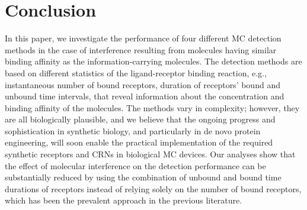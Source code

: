 \documentclass[twocolumn]{IEEEtran}
\newcommand{\E}{\mathrm{E}}
\begin{document}
%

\section{Conclusion}
\label{sec:conclusion}
In this paper, we investigate the performance of four different MC detection methods in the case of interference resulting from molecules having similar binding affinity as the information-carrying molecules. The detection methods are based on different statistics of the ligand-receptor binding reaction, e.g., instantaneous number of bound receptors, duration of receptors' bound and unbound time intervals, that reveal information about the concentration and binding affinity of the molecules. The methods vary in complexity; however, they are all biologically plausible, and we believe that the ongoing progress and sophistication in synthetic biology, and particularly in de novo protein engineering,  will soon enable the practical implementation of the required synthetic receptors and CRNs in biological MC devices. Our analyses show that the effect of molecular interference on the detection performance can be substantially reduced by using the combination of unbound and bound time durations of receptors instead of relying solely on the number of bound receptors, which has been the prevalent approach in the previous literature.
\end{document}
